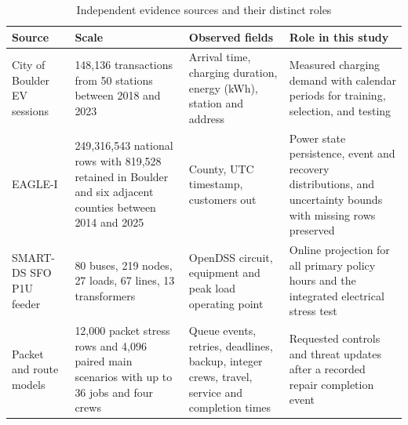 \begin{table}[t]
\centering
\caption{Independent evidence sources and their distinct roles}
\label{tab:evidence-sources}
\begin{tabular}{p{}p{}p{}p{}}
\toprule
Source & Scale & Observed fields & Role in this study \\
\midrule
City of Boulder EV sessions & 148,136 transactions from 50 stations between 2018 and 2023 & Arrival time, charging duration, energy (kWh), station and address & Measured charging demand with calendar periods for training, selection, and testing \\
EAGLE-I & 249,316,543 national rows with 819,528 retained in Boulder and six adjacent counties between 2014 and 2025 & County, UTC timestamp, customers out & Power state persistence, event and recovery distributions, and uncertainty bounds with missing rows preserved \\
SMART-DS SFO P1U feeder & 80 buses, 219 nodes, 27 loads, 67 lines, 13 transformers & OpenDSS circuit, equipment and peak load operating point & Online projection for all primary policy hours and the integrated electrical stress test \\
Packet and route models & 12,000 packet stress rows and 4,096 paired main scenarios with up to 36 jobs and four crews & Queue events, retries, deadlines, backup, integer crews, travel, service and completion times & Requested controls and threat updates after a recorded repair completion event \\
\bottomrule
\end{tabular}
\end{table}
